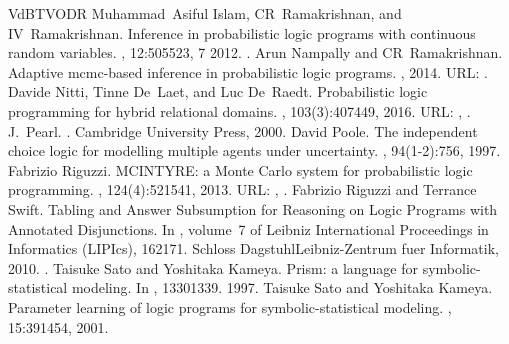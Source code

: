 \documentclass[letterpaper,10pt,english]{sphinxmanual}
\begin{document}
\begin{sphinxthebibliography}{VdBTVODR}
Muhammad Asiful Islam, CR Ramakrishnan, and IV Ramakrishnan. Inference in probabilistic logic programs with continuous random variables. , 12:505\textendash{}523, 7 2012. .
Arun Nampally and CR Ramakrishnan. Adaptive mcmc-based inference in probabilistic logic programs. , 2014. URL: .
Davide Nitti, Tinne De Laet, and Luc De Raedt. Probabilistic logic programming for hybrid relational domains. , 103(3):407\textendash{}449, 2016. URL: , .
J. Pearl. . Cambridge University Press, 2000.
David Poole. The independent choice logic for modelling multiple agents under uncertainty. , 94(1-2):7\textendash{}56, 1997.
Fabrizio Riguzzi. MCINTYRE: a Monte Carlo system for probabilistic logic programming. , 124(4):521\textendash{}541, 2013. URL: , .
Fabrizio Riguzzi and Terrance Swift. Tabling and Answer Subsumption for Reasoning on Logic Programs with Annotated Disjunctions. In , volume 7 of Leibniz International Proceedings in Informatics (LIPIcs), 162\textendash{}171. Schloss Dagstuhl\textendash{}Leibniz-Zentrum fuer Informatik, 2010. .
Taisuke Sato and Yoshitaka Kameya. Prism: a language for symbolic-statistical modeling. In , 1330\textendash{}1339. 1997.
Taisuke Sato and Yoshitaka Kameya. Parameter learning of logic programs for symbolic-statistical modeling. , 15:391\textendash{}454, 2001.

\end{sphinxthebibliography}
\end{document}
